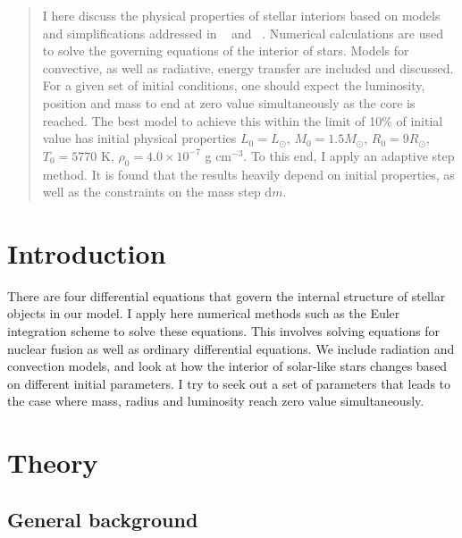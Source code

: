 \documentclass[a4paper, 11pt, english]{article}
\author{Vedad Hodzic}
\newcommand{\D}[1]{\mathrm{d}#1}
\begin{document}
\begin{titlepage}
    \thispagestyle{empty}
    
\end{titlepage}

\begin{abstract}
	I here discuss the physical properties of stellar interiors based on models and
	simplifications addressed in ~\cite{stix} and ~\cite{gudiksen}. Numerical calculations
	are used to solve the governing equations of the interior of stars. Models for
	convective, as well as radiative, energy transfer are included and discussed. For a
	given set of initial conditions, one should expect the luminosity, position and mass
	to end at zero value simultaneously as the core is reached. The best model to achieve
	this within the limit of 10\% of initial value has initial physical properties
	$L_0 = L_{\odot}$, $M_0 =
	1.5M_{\odot}$, $R_0 = 9R_{\odot}$, $T_0 = 5770$ K, $\rho_0 = 4.0 \times 10^{-7}$ g
	$\mathrm{cm}^{-3}$. To this end, I apply an adaptive step method.
	It is found that the results heavily depend on initial properties,
	as well as the constraints on the mass step $\D{m}$.
\end{abstract}

\section{Introduction}

There are four differential equations that govern the internal structure of stellar
objects in our
model. I apply here numerical methods such as the Euler integration scheme to solve these
equations. This involves solving equations for nuclear fusion as well as ordinary
differential equations. We include radiation and convection models, and look at how 
the interior of solar-like stars changes based on
different initial
parameters. I try to seek out a set of parameters that leads to the case where mass,
radius and luminosity reach zero value simultaneously. 

\section{Theory}
\subsection{General background}
\end{document}

